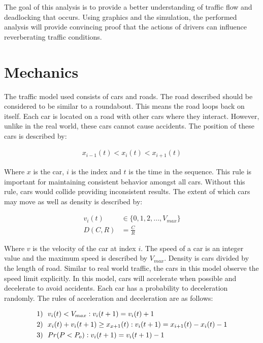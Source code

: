 \documentclass[12pt]{extarticle}
\begin{document}
The goal of this analysis is to provide a better understanding of traffic flow and deadlocking that occurs. Using graphics and the simulation, the performed analysis will provide convincing proof that the actions of drivers can influence reverberating traffic conditions.

\section{Mechanics}

The traffic model used consists of cars and roads. The road described should be considered to be similar to a roundabout. This means the road loops back on itself. Each car is located on a road with other cars where they interact. However, unlike in the real world, these cars cannot cause accidents. The position of these cars is described by:

\begin{align}
\label{e1}
x_{i-1}(t) < x_{i}(t) < x_{i+1}(t)
\end{align}

Where $x$ is the car, $i$ is the index and $t$ is the time in the sequence. This rule is important for maintaining consistent behavior amongst all cars. Without this rule, cars would collide providing inconsistent results. The extent of which cars may move as well as density is described by:

\begin{align}
\label{e2}
v_i(t) &\in \{0,1,2, ..., V_{max}\} \\
\label{e3}
D(C,R) &= \frac{C}{R}
\end{align}

Where $v$ is the velocity of the car at index $i$. The speed of a car is an integer value and the maximum speed is described by $V_{max}$. Density is cars divided by the length of road. Similar to real world traffic, the cars in this model observe the speed limit explicitly. In this model, cars will accelerate when possible and decelerate to avoid accidents. Each car has a probability to deceleration randomly. The rules of acceleration and deceleration are as follows:

\begin{align}
\notag 1)& \ \ v_i(t) < V_{max} : v_i(t+1) = v_i(t) + 1\\ 
\notag 2)& \ \  x_i(t) + v_i(t + 1) \geq x_{x+1}(t) : v_i(t + 1) =x_{i+1}(t) - x_i(t) - 1\\
\label{e4}
3)& \ \ Pr(P < P_{o}) :v_i(t+1) = v_i(t+1) - 1 
\end{align}
\end{document}
